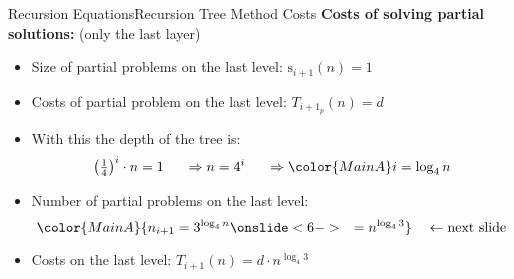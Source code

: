 
\begin{frame}{Recursion Equations}{Recursion Tree Method Costs}
  \textbf{Costs of solving partial solutions:} (only the last layer)
  \begin{itemize}
    \item<2->
      Size of partial problems on the {\color{MainA}last level}:
      {\color{MainA}$\mathrm{s}_{i+1}(n) = 1$}
    \item<3->
      Costs of partial problem on the {\color{MainA}last level}:
      {\color{MainA}$T_{i+1_p}(n) = d$}
    \item<4->
      With this the depth of the tree is:
      \begin{displaymath}
        \left(\tfrac{1}{4}\right)^i \cdot n = 1
        \hspace{1.5em}\Rightarrow n = 4^i
        \hspace{1.5em}\Rightarrow\color{MainA} i = \log_4 n
      \end{displaymath}
      \vspace{-1em}
    \item<5->
      Number of partial problems on the {\color{MainA}last level}:
      \begin{displaymath}
        \color{MainA}{n_{i+1} = 3^{\log_4 n}    \onslide<6-> \quad=
          n^{\log_4 3}}  \quad \leftarrow \text{next slide}
      \end{displaymath}
    \item<7->
      Costs on the {\color{MainA}last level}:
      {\color{MainA}$T_{i+1}(n) = d \cdot n^{\log_4 3}$}
  \end{itemize}
\end{frame}


